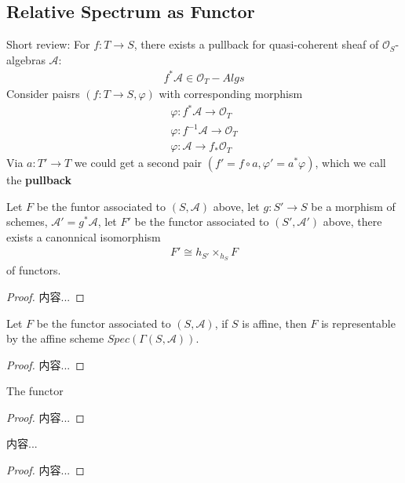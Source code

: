 \documentclass[Total.tex]{subfiles}
\begin{document}
			\subsection{Relative Spectrum as Functor}
				Short review: For $f:T\rightarrow S$, there exists a pullback for quasi-coherent sheaf of $\mathcal{O}_S$-algebras $\mathcal{A}$:
				\begin{gather*}
					f^*\mathcal{A}\in \mathcal{O}_T-Algs
				\end{gather*}
				Consider paisrs $(f:T\rightarrow S,\varphi)$ with corresponding morphism
				\begin{gather*}
					\varphi:f^*\mathcal{A}\rightarrow \mathcal{O}_T\\
					\varphi:f^{-1}\mathcal{A}\rightarrow \mathcal{O}_T\\
					\varphi:\mathcal{A}\rightarrow f_*\mathcal{O}_T		
				\end{gather*}
				Via $a:T'\rightarrow T$ we could get a second pair $(f'=f\circ a,\varphi'=a^*\varphi)$, which we call the \textbf{pullback}
				\begin{lemma}
					Let $F$ be the funtor associated to $(S,\mathcal{A})$ above, let $g:S'\rightarrow S$ be a morphism of schemes, $\mathcal{A}'=g^*\mathcal{A}$, let $F'$ be the functor associated to $(S',\mathcal{A}')$ above, there exists a canonnical isomorphism
					\begin{gather*}
						F'\cong h_{S'}\times_{h_S} F
					\end{gather*}
					of functors.
				\end{lemma}
				\begin{proof}
					内容...
				\end{proof}
				
				\begin{lemma}
					Let $F$ be the functor associated to $(S,\mathcal{A})$, if $S$ is affine, then $F$ is representable by the affine scheme $Spec(\Gamma(S,\mathcal{A}))$.
				\end{lemma}
				\begin{proof}
					内容...
				\end{proof}
				
				\begin{lemma}
					The functor 
				\end{lemma}
				\begin{proof}
					内容...
				\end{proof}
				\begin{lemma}
					内容...
				\end{lemma}
				\begin{proof}
					内容...
				\end{proof}
\end{document}
